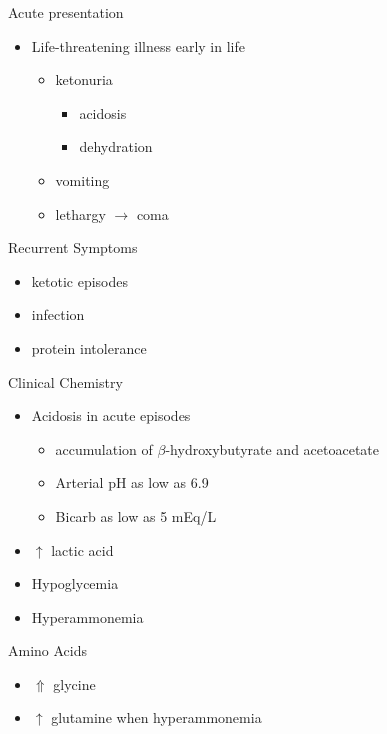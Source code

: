 \documentclass[presentation, smaller]{beamer}
\begin{document}
\begin{frame}[label={sec:orgheadline6}]{Acute presentation}
\begin{itemize}
\item Life-threatening illness early in life
\begin{itemize}
\item ketonuria
\begin{itemize}
\item acidosis
\item dehydration
\end{itemize}
\item vomiting
\item lethargy \(\to\) coma
\end{itemize}
\end{itemize}
\end{frame}

\begin{frame}[label={sec:orgheadline7}]{Recurrent Symptoms}
\begin{itemize}
\item ketotic episodes
\item infection
\item protein intolerance
\end{itemize}
\end{frame}


\begin{frame}[label={sec:orgheadline8}]{Clinical Chemistry}
\begin{itemize}
\item Acidosis in acute episodes
\begin{itemize}
\item accumulation of \(\beta\)-hydroxybutyrate and acetoacetate
\item Arterial pH as low as 6.9
\item Bicarb as low as 5 mEq/L
\end{itemize}
\item \(\uparrow\) lactic acid
\item Hypoglycemia
\item Hyperammonemia
\end{itemize}
\end{frame}

\begin{frame}[label={sec:orgheadline9}]{Amino Acids}
\begin{itemize}
\item \(\Uparrow\) glycine
\item \(\uparrow\) glutamine when hyperammonemia
\end{itemize}
\end{frame}
\end{document}
